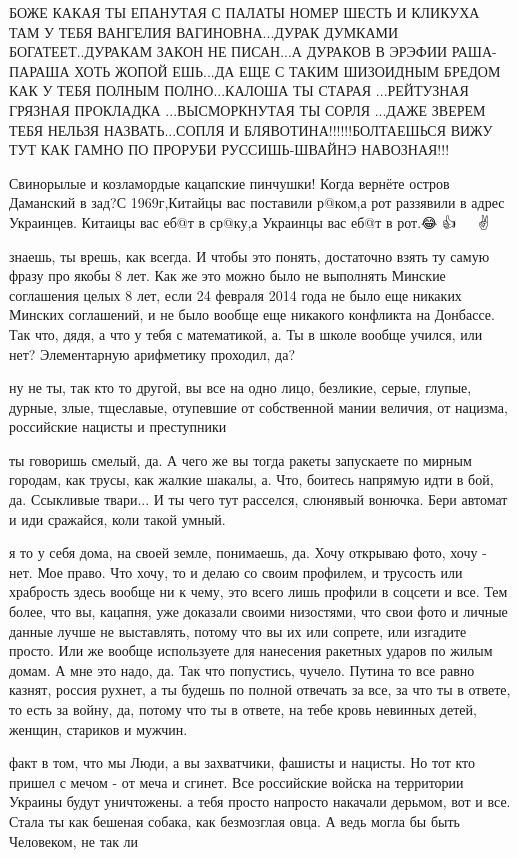 БОЖЕ КАКАЯ ТЫ ЕПАНУТАЯ С ПАЛАТЫ НОМЕР ШЕСТЬ И КЛИКУХА ТАМ У ТЕБЯ ВАНГЕЛИЯ
ВАГИНОВНА...ДУРАК ДУМКАМИ БОГАТЕЕТ..ДУРАКАМ ЗАКОН НЕ ПИСАН...А ДУРАКОВ В ЭРЭФИИ
РАША-ПАРАША ХОТЬ ЖОПОЙ ЕШЬ...ДА ЕЩЕ С ТАКИМ ШИЗОИДНЫМ БРЕДОМ КАК У ТЕБЯ ПОЛНЫМ
ПОЛНО...КАЛОША ТЫ СТАРАЯ ...РЕЙТУЗНАЯ ГРЯЗНАЯ ПРОКЛАДКА ...ВЫСМОРКНУТАЯ ТЫ
СОРЛЯ ...ДАЖЕ ЗВЕРЕМ ТЕБЯ НЕЛЬЗЯ НАЗВАТЬ...СОПЛЯ И БЛЯВОТИНА!!!!!!БОЛТАЕШЬСЯ
ВИЖУ ТУТ КАК ГАМНО ПО ПРОРУБИ РУССИШЬ-ШВАЙНЭ НАВОЗНАЯ!!!

Свинорылые и козламордые кацапские пинчушки!  Когда вернёте остров Даманский в
зад?С 1969г,Китайцы вас поставили р@ком,а рот раззявили в адрес Украинцев.
Китаицы вас еб@т в ср@ку,а Украинцы вас еб@т в рот.😂 👍 💙 💛 ✌

знаешь, ты врешь, как всегда. И чтобы это понять, достаточно взять ту самую
фразу про якобы 8 лет. Как же это можно было не выполнять Минские соглашения
целых 8 лет, если 24 февраля 2014 года не было еще никаких Минских соглашений,
и не было вообще еще никакого конфликта на Донбассе. Так что, дядя, а что у
тебя с математикой, а. Ты в школе вообще учился, или нет? Элементарную
арифметику проходил, да?


ну не ты, так кто то другой, вы все на одно лицо, безликие, серые, глупые,
дурные, злые, тщеславые, отупевшие от собственной мании величия, от нацизма,
российские нацисты и преступники

ты говоришь смелый, да. А чего же вы тогда ракеты запускаете по мирным городам,
как трусы, как жалкие шакалы, а. Что, боитесь напрямую идти в бой, да.
Ссыкливые твари... И ты чего тут расселся, слюнявый вонючка. Бери автомат и иди
сражайся, коли такой умный.

я то у себя дома, на своей земле, понимаешь, да. Хочу открываю фото, хочу -
нет. Мое право. Что хочу, то и делаю со своим профилем, и трусость или
храбрость здесь вообще ни к чему, это всего лишь профили в соцсети и все. Тем
более, что вы, кацапня, уже доказали своими низостями, что свои фото и личные
данные лучше не выставлять, потому что вы их или сопрете, или изгадите просто.
Или же вообще используете для нанесения ракетных ударов по жилым домам. А мне
это надо, да. Так что попустись, чучело. Путина то все равно казнят, россия
рухнет, а ты будешь по полной отвечать за все, за что ты в ответе, то есть за
войну, да, потому что ты в ответе, на тебе кровь невинных детей, женщин,
стариков и мужчин.



факт в том, что мы Люди, а вы захватчики, фашисты и нацисты. Но тот кто пришел
с мечом - от меча и сгинет. Все российские войска на территории Украины будут
уничтожены.  
а тебя просто напросто накачали дерьмом, вот и все. Стала ты как бешеная
собака, как безмозглая овца. А ведь могла бы быть Человеком, не так ли 


